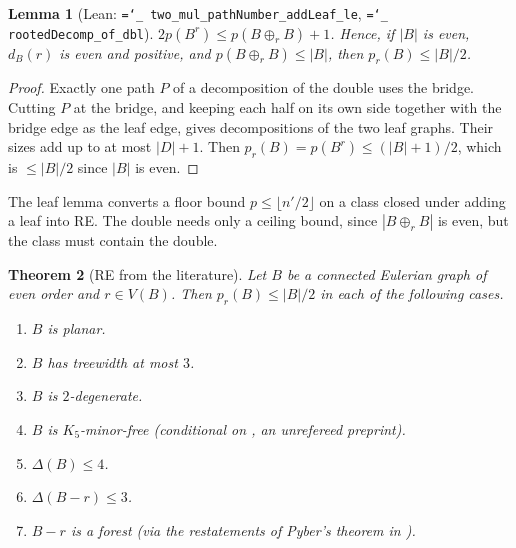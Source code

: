 \documentclass[11pt]{amsart}
\newtheorem{theorem}{Theorem}[section]
\newtheorem{lemma}[theorem]{Lemma}
\theoremstyle{definition}
\newcommand{\pr}{p_r}
\newcommand{\lean}[1]{\texttt{\hyphenchar\font=`\_ #1}}
\begin{document}
\begin{lemma}[Lean: \lean{two\_mul\_pathNumber\_addLeaf\_le}, \lean{rootedDecomp\_of\_dbl}]\label{lem:dbl}
$2p(B^r)\le p(B\oplus_r B)+1$. Hence, if $|B|$ is even, $d_B(r)$ is even and positive, and
$p(B\oplus_r B)\le |B|$, then $\pr(B)\le |B|/2$.
\end{lemma}

\begin{proof}
Exactly one path $P$ of a decomposition of the double uses the bridge. Cutting $P$ at the bridge, and
keeping each half on its own side together with the bridge edge as the leaf edge, gives decompositions
of the two leaf graphs. Their sizes add up to at most $|D|+1$. Then
$\pr(B)=p(B^r)\le(|B|+1)/2$, which is $\le|B|/2$ since $|B|$ is even.
\end{proof}

The leaf lemma converts a floor bound $p\le\lfloor n'/2\rfloor$ on a class closed under adding a leaf
into RE. The double needs only a ceiling bound, since $|B\oplus_rB|$ is even, but the class must
contain the double.

\begin{theorem}[RE from the literature]\label{thm:lit}
Let $B$ be a connected Eulerian graph of even order and $r\in V(B)$. Then $\pr(B)\le|B|/2$ in each of
the following cases.
\begin{enumerate}[label=(\alph*)]
\item $B$ is planar.
\item $B$ has treewidth at most $3$.
\item $B$ is $2$-degenerate.
\item $B$ is $K_5$-minor-free (conditional on \cite{ZLH}, an unrefereed preprint).
\item $\Delta(B)\le 4$.
\item $\Delta(B-r)\le3$.
\item $B-r$ is a forest (via the restatements of Pyber's theorem in \cite{BS,BP}).
\end{enumerate}
\end{theorem}
\end{document}
